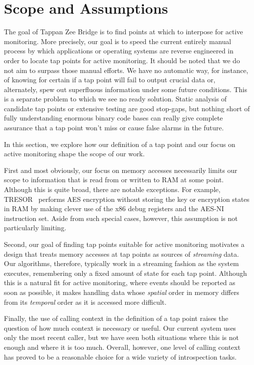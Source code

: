 \section{Scope and Assumptions}
\label{sec:scope}

The goal of Tappan Zee Bridge is to find points at which to interpose
for active monitoring. More precisely, our goal is to speed the current
entirely manual process by which applications or operating systems are
reverse engineered in order to locate tap points for active monitoring.
It should be noted that we do not aim to surpass those manual efforts.
We have no automatic way, for instance, of knowing for certain if a tap
point will fail to output crucial data or, alternately, spew out
superfluous information under some future conditions. This is a separate
problem to which we see no ready solution. Static analysis of candidate
tap points or extensive testing are good stop-gaps, but nothing short of
fully understanding enormous binary code bases can really give complete
assurance that a tap point won't miss or cause false alarms in the
future. 

In this section, we explore how our definition of a tap point and our
focus on active monitoring shape the scope of our work.

First and most obviously, our focus on memory accesses necessarily
limits our scope to information that is read from or written to RAM at
some point. Although this is quite broad, there are notable exceptions.
For example, TRESOR~\cite{Muller:2011} performs AES encryption without
storing the key or encryption states in RAM by making clever use of the
x86 debug registers and the AES-NI instruction set. Aside from such
special cases, however, this assumption is not particularly limiting.

Second, our goal of finding tap points suitable for active monitoring
motivates a design that treats memory accesses at tap points as sources
of \emph{streaming} data. Our algorithms, therefore, typically work in a
streaming fashion as the system executes, remembering only a fixed
amount of state for each tap point. Although this is a natural fit for
active monitoring, where events should be reported as soon as
possible, it makes handling data whose \emph{spatial} order in memory
differs from its \emph{temporal} order as it is accessed more difficult.

Finally, the use of calling context in the definition of a tap point
raises the question of how much context is necessary or useful. Our
current system uses only the most recent caller, but we have seen
both situations where this is not enough and where it is too much.
Overall, however, one level of calling context has proved to be a
reasonable choice for a wide variety of introspection tasks.

